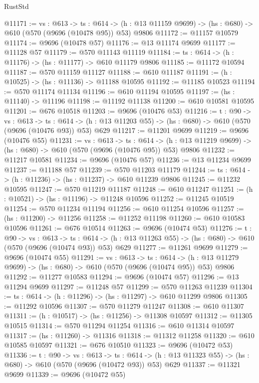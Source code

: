 \begin{lexlean}{RustStd}
\begin{coremodule}
@11171 := {vs : @613} ->
  {ts : @614} -> (h : @13 @11159 @9699) -> (hs : @680) -> @610 (@570 (@9696 (@10478 @95)) @53) @9806
@11172 := @11157 @10579
@11174 := @9696 (@10478 @57)
@11176 := @13 @11174 @9699
@11177 := @11128 @57
@11179 := @570 @11143 @11119
@11184 := {ts : @614} -> (h : @11176) -> (hs : @11177) -> @610 @11179 @9806
@11185 := @11172 @10594
@11187 := @570 @11159 @11127
@11188 := @610 @11187
@11191 := (h : @10525) -> (hs : @11136) -> @11188 @10595
@11192 := @11185 @10523
@11194 := @570 @11174 @11134
@11196 := @610 @11194 @10595
@11197 := (hs : @11140) -> @11196
@11198 := @11192 @11138
@11200 := @610 @10581 @10595
@11201 := @676 @10518
@11203 := @9696 (@10476 @53)
@11216 := {t : @90} ->
  {vs : @613} ->
  {ts : @614} -> (h : @13 @11203 @55) -> (hs : @680) -> @610 (@570 (@9696 (@10476 @93)) @53) @629
@11217 := @11201 @9699
@11219 := @9696 (@10476 @55)
@11231 := {vs : @613} ->
  {ts : @614} -> (h : @13 @11219 @9699) -> (hs : @680) -> @610 (@570 (@9696 (@10476 @95)) @53) @9806
@11232 := @11217 @10581
@11234 := @9696 (@10476 @57)
@11236 := @13 @11234 @9699
@11237 := @11188 @57
@11239 := @570 @11203 @11179
@11244 := {ts : @614} -> (h : @11236) -> (hs : @11237) -> @610 @11239 @9806
@11245 := @11232 @10595
@11247 := @570 @11219 @11187
@11248 := @610 @11247
@11251 := (h : @10521) -> (hs : @11196) -> @11248 @10596
@11252 := @11245 @10519
@11254 := @570 @11234 @11194
@11256 := @610 @11254 @10596
@11257 := (hs : @11200) -> @11256
@11258 := @11252 @11198
@11260 := @610 @10583 @10596
@11261 := @676 @10514
@11263 := @9696 (@10474 @53)
@11276 := {t : @90} ->
  {vs : @613} ->
  {ts : @614} -> (h : @13 @11263 @55) -> (hs : @680) -> @610 (@570 (@9696 (@10474 @93)) @53) @629
@11277 := @11261 @9699
@11279 := @9696 (@10474 @55)
@11291 := {vs : @613} ->
  {ts : @614} -> (h : @13 @11279 @9699) -> (hs : @680) -> @610 (@570 (@9696 (@10474 @95)) @53) @9806
@11292 := @11277 @10583
@11294 := @9696 (@10474 @57)
@11296 := @13 @11294 @9699
@11297 := @11248 @57
@11299 := @570 @11263 @11239
@11304 := {ts : @614} -> (h : @11296) -> (hs : @11297) -> @610 @11299 @9806
@11305 := @11292 @10596
@11307 := @570 @11279 @11247
@11308 := @610 @11307
@11311 := (h : @10517) -> (hs : @11256) -> @11308 @10597
@11312 := @11305 @10515
@11314 := @570 @11294 @11254
@11316 := @610 @11314 @10597
@11317 := (hs : @11260) -> @11316
@11318 := @11312 @11258
@11320 := @610 @10585 @10597
@11321 := @676 @10510
@11323 := @9696 (@10472 @53)
@11336 := {t : @90} ->
  {vs : @613} ->
  {ts : @614} -> (h : @13 @11323 @55) -> (hs : @680) -> @610 (@570 (@9696 (@10472 @93)) @53) @629
@11337 := @11321 @9699
@11339 := @9696 (@10472 @55)

\end{coremodule}
\end{lexlean}

